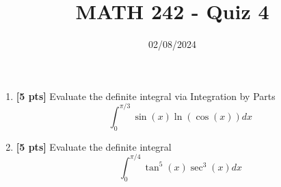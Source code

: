 \documentclass[12pt]{article}
\title{MATH 242 - Quiz 4}
\date{02/08/2024}
\begin{document}
\maketitle


\begin{enumerate}

\item \textbf{[5 pts]} Evaluate the definite integral via Integration by Parts
$$\int_0^{\pi/3}\sin(x)\ln(\cos(x))dx$$


\pagebreak


\item \textbf{[5 pts]} Evaluate the definite integral
$$\int_0^{\pi/4}\tan^5(x)\sec^3(x)dx$$


\end{enumerate}
\end{document}
